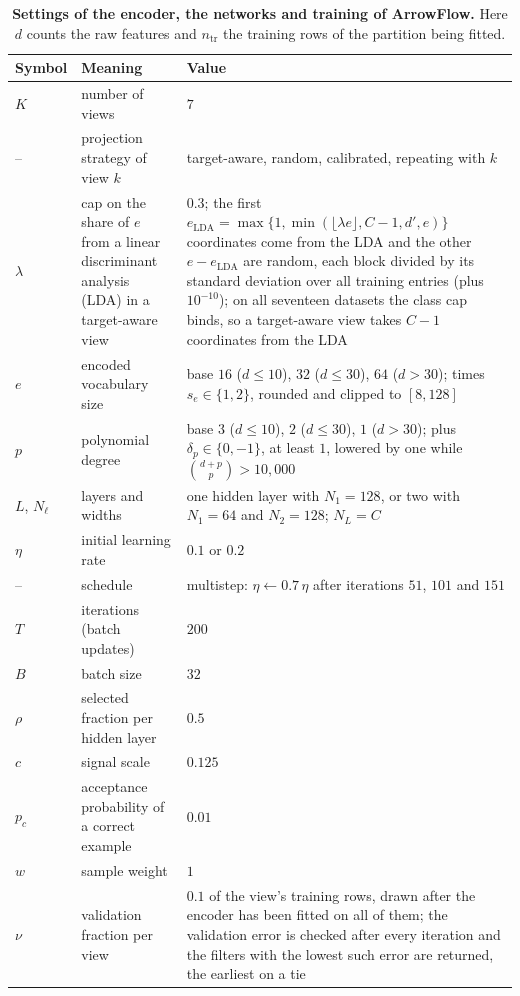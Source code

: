 \begin{table}[!htbp]
\caption{\textbf{Settings of the encoder, the networks and training of ArrowFlow.} Here $d$ counts the raw features and $n_{\mathrm{tr}}$ the training rows of the partition being fitted.}
\label{tab:settings}
\centering
\small
\begin{tabular}{@{}l p{} p{}@{}}
\toprule
Symbol & Meaning & Value \\
\midrule
$K$ & number of views & $7$ \\
-- & projection strategy of view $k$ & target-aware, random, calibrated, repeating with $k$ \\
$\lambda$ & cap on the share of $e$ from a linear discriminant analysis (LDA) in a target-aware view & $0.3$; the first $e_{\mathrm{LDA}}=\max\{1,\min(\lfloor\lambda e\rfloor,C-1,d',e)\}$ coordinates come from the LDA and the other $e-e_{\mathrm{LDA}}$ are random, each block divided by its standard deviation over all training entries (plus $10^{-10}$); on all seventeen datasets the class cap binds, so a target-aware view takes $C-1$ coordinates from the LDA \\
$e$ & encoded vocabulary size & base $16$ ($d\le10$), $32$ ($d\le30$), $64$ ($d>30$); times $s_e\in\{1,2\}$, rounded and clipped to $[8,128]$ \\
$p$ & polynomial degree & base $3$ ($d\le10$), $2$ ($d\le30$), $1$ ($d>30$); plus $\delta_p\in\{0,-1\}$, at least $1$, lowered by one while $\binom{d+p}{p}>10{,}000$ \\
$L$, $N_\ell$ & layers and widths & one hidden layer with $N_1=128$, or two with $N_1=64$ and $N_2=128$; $N_L=C$ \\
$\eta$ & initial learning rate & $0.1$ or $0.2$ \\
-- & schedule & multistep: $\eta\leftarrow0.7\,\eta$ after iterations $51$, $101$ and $151$ \\
$T$ & iterations (batch updates) & $200$ \\
$B$ & batch size & $32$ \\
$\rho$ & selected fraction per hidden layer & $0.5$ \\
$c$ & signal scale & $0.125$ \\
$p_c$ & acceptance probability of a correct example & $0.01$ \\
$w$ & sample weight & $1$ \\
$\nu$ & validation fraction per view & $0.1$ of the view's training rows, drawn after the encoder has been fitted on all of them; the validation error is checked after every iteration and the filters with the lowest such error are returned, the earliest on a tie \\

\end{tabular}
\end{table}
